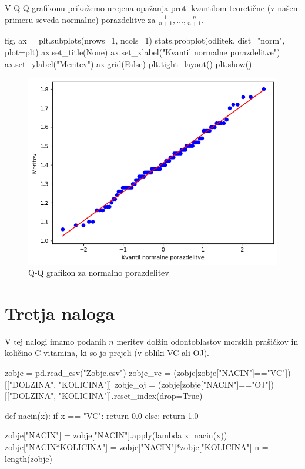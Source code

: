\documentclass[10pt, a4paper]{article}
\begin{document}
V Q-Q grafikonu prikažemo urejena opažanja proti kvantilom teoretične (v našem primeru seveda normalne)
porazdelitve za $\frac{1}{n + 1}, \dots, \frac{n}{n + 1}$.

\begin{python}
    fig, ax = plt.subplots(nrows=1, ncols=1)
    stats.probplot(odlitek, dist="norm", plot=plt)
    ax.set_title(None)
    ax.set_xlabel("Kvantil normalne porazdelitve")
    ax.set_ylabel("Meritev")
    ax.grid(False)
    plt.tight_layout()
    plt.show()
\end{python}

\begin{figure}[H]
    \centering
    \includegraphics[scale=0.75]{Images/2c.png}
    \caption{Q-Q grafikon za normalno porazdelitev}
\end{figure}

\section*{Tretja naloga}

V tej nalogi imamo podanih $n$ meritev dolžin odontoblastov morskih prašičkov in količino C 
vitamina, ki so jo prejeli (v obliki VC ali OJ).

\begin{python}
    zobje = pd.read_csv("Zobje.csv")
    zobje_vc = (zobje[zobje["NACIN"]=="VC"])[["DOLZINA", "KOLICINA"]]
    zobje_oj = (zobje[zobje["NACIN"]=="OJ"])[["DOLZINA", "KOLICINA"]].reset_index(drop=True)

    def nacin(x):
        if x == "VC":
            return 0.0
        else:
            return 1.0

    zobje["NACIN"] = zobje["NACIN"].apply(lambda x: nacin(x))
    zobje["NACIN*KOLICINA"] = zobje["NACIN"]*zobje["KOLICINA"]
    n = length(zobje)
\end{python}
\end{document}
